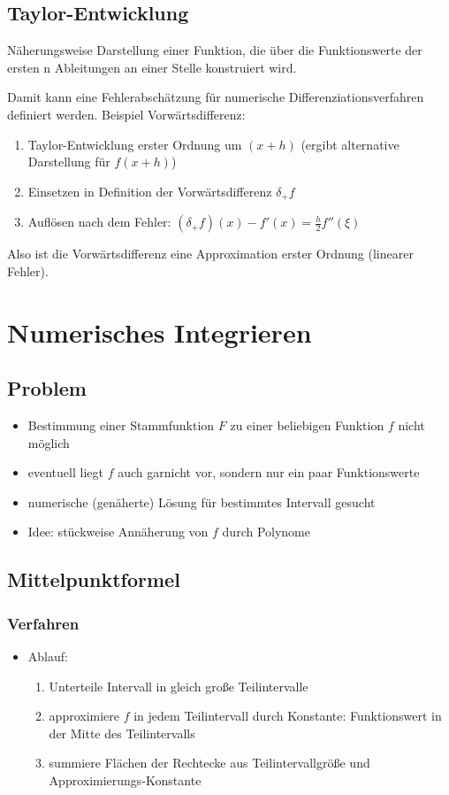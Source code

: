 \documentclass[a4paper, 12pt]{article}
\begin{document}
\subsection{Taylor-Entwicklung}
Näherungsweise Darstellung einer Funktion, die über die Funktionswerte der ersten n Ableitungen an einer Stelle konstruiert wird.

Damit kann eine Fehlerabschätzung für numerische Differenziationsverfahren definiert werden. Beispiel Vorwärtsdifferenz:
\begin{enumerate}
  \item Taylor-Entwicklung erster Ordnung um \((x+h)\) (ergibt alternative Darstellung für \(f(x+h)\))
  \item Einsetzen in Definition der Vorwärtsdifferenz \(\delta_+f\)
  \item Auflösen nach dem Fehler: \((\delta_+f)(x) - f'(x) = \frac{h}{2}f''(\xi)\)
\end{enumerate}
Also ist die Vorwärtsdifferenz eine Approximation erster Ordnung (linearer Fehler).


\section{Numerisches Integrieren}


\subsection{Problem}
\begin{itemize}
  \item Bestimmung einer Stammfunktion \(F\) zu einer beliebigen Funktion \(f\) nicht möglich
  \item eventuell liegt \(f\) auch garnicht vor, sondern nur ein paar Funktionswerte
  \item numerische (genäherte) Lösung für bestimmtes Intervall gesucht
  \item Idee: stückweise Annäherung von \(f\) durch Polynome
\end{itemize}


\subsection{Mittelpunktformel}

\subsubsection*{Verfahren}
\begin{itemize}
  \item Ablauf:
    \begin{enumerate}
      \item Unterteile Intervall in gleich große Teilintervalle
      \item approximiere \(f\) in jedem Teilintervall durch Konstante: Funktionswert in der Mitte des Teilintervalls
      \item summiere Flächen der Rechtecke aus Teilintervallgröße und Ap\-pro\-xi\-mie\-rungs-Kon\-stan\-te
    \end{enumerate}
\end{itemize}
\end{document}
